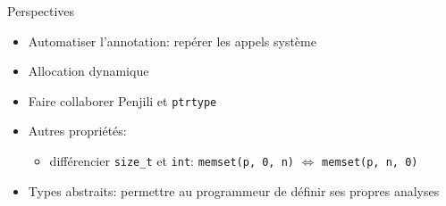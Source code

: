 \begin{frame}{Perspectives}
    \begin{itemize}
        \item Automatiser l'annotation: repérer les appels système
        \item Allocation dynamique
        \item Faire collaborer Penjili et \texttt{ptrtype}
        \item Autres propriétés:
            \begin{itemize}
                \item différencier \texttt{size\_t} et \texttt{int}: \texttt{memset(p, 0, n)} $⇔$ \texttt{memset(p, n, 0)}
            \end{itemize}
        \item Types abstraits: permettre au programmeur de définir ses propres
            analyses
        \end{itemize}
\end{frame}
